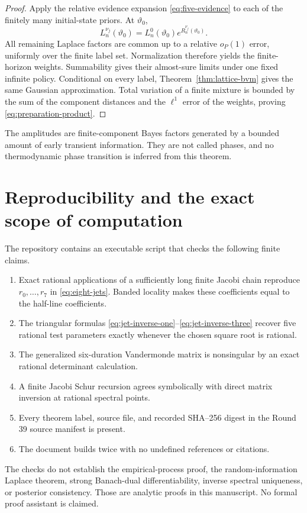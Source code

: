 \begin{proof}
Apply the relative evidence expansion
\eqref{eq:five-evidence} to each of the finitely many initial-state priors.
At \(\vartheta_0\),
\[
 L_n^{\nu_j}(\vartheta_0)
 =L_n^0(\vartheta_0)e^{R_n^{\nu_j}(\vartheta_0)}.
\]
All remaining Laplace factors are common up to a relative \(o_P(1)\) error,
uniformly over the finite label set.  Normalization therefore yields the
finite-horizon weights.  Summability gives their almost-sure limits under one
fixed infinite policy.  Conditional on every label, Theorem~\ref{thm:lattice-bvm}
gives the same Gaussian approximation.  Total variation of a finite mixture
is bounded by the sum of the component distances and the \(\ell^1\) error of
the weights, proving \eqref{eq:preparation-product}.
\end{proof}

\begin{remark}
The amplitudes are finite-component Bayes factors generated by a bounded
amount of early transient information.  They are not called phases, and no
thermodynamic phase transition is inferred from this theorem.
\end{remark}

\section{Reproducibility and the exact scope of computation}
\label{sec:verification}

The repository contains an executable script that checks the following finite
claims.
\begin{enumerate}
\item Exact rational applications of a sufficiently long finite Jacobi chain
reproduce \(r_0,\ldots,r_7\) in \eqref{eq:eight-jets}.  Banded locality makes
these coefficients equal to the half-line coefficients.
\item The triangular formulas
\eqref{eq:jet-inverse-one}--\eqref{eq:jet-inverse-three} recover five rational
test parameters exactly whenever the chosen square root is rational.
\item The generalized six-duration Vandermonde matrix is nonsingular by an
exact rational determinant calculation.
\item A finite Jacobi Schur recursion agrees symbolically with direct matrix
inversion at rational spectral points.
\item Every theorem label, source file, and recorded SHA--256 digest in the
Round 39 source manifest is present.
\item The document builds twice with no undefined references or citations.
\end{enumerate}
The checks do not establish the empirical-process proof, the random-information
Laplace theorem, strong Banach-dual differentiability, inverse spectral
uniqueness, or posterior consistency.  Those are analytic proofs in this
manuscript.  No formal proof assistant is claimed.

